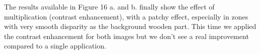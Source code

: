 \documentclass[a4paper,11pt]{article}
\begin{document}
The results available in Figure 16 a. and b. finally show the effect of multiplication (contrast enhancement), with a patchy effect, especially in zones with very smooth disparity as the background wooden part. This time we applied the contrast enhancement for both images but we don't see a real improvement compared to a single application.
\end{document}
